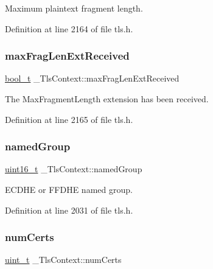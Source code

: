 Maximum plaintext fragment length. 



Definition at line 2164 of file tls.\+h.

\mbox{\label{struct__TlsContext_a777c6fff0557967c0103e15f6fa1f837}} 
\subsubsection{\texorpdfstring{max\+Frag\+Len\+Ext\+Received}{maxFragLenExtReceived}}
{\footnotesize\ttfamily \hyperlink{compiler__port_8h_a812d16e5494522586b3784e55d479912}{bool\+\_\+t} \+\_\+\+Tls\+Context\+::max\+Frag\+Len\+Ext\+Received}



The Max\+Fragment\+Length extension has been received. 



Definition at line 2165 of file tls.\+h.

\mbox{\label{struct__TlsContext_aa74949fa9cb49787de6ca8bc1b222280}} 
\subsubsection{\texorpdfstring{named\+Group}{namedGroup}}
{\footnotesize\ttfamily \hyperlink{stdint_8h_a273cf69d639a59973b6019625df33e30}{uint16\+\_\+t} \+\_\+\+Tls\+Context\+::named\+Group}



E\+C\+D\+HE or F\+F\+D\+HE named group. 



Definition at line 2031 of file tls.\+h.

\mbox{\label{struct__TlsContext_adb4903f8e4775c48edfb89ede109eab3}} 
\subsubsection{\texorpdfstring{num\+Certs}{numCerts}}
{\footnotesize\ttfamily \hyperlink{compiler__port_8h_a12a1e9b3ce141648783a82445d02b58d}{uint\+\_\+t} \+\_\+\+Tls\+Context\+::num\+Certs}



